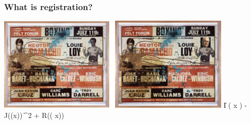 \begin{frame}
\frametitle{What is registration?}
\includegraphics[height=1.8in]{../Art/RegistrationBasquiatDeWarp.pdf}
\newline
\newline
\newline
\| I ( x ) - J(\phi(x)) \|^2  + R(\phi( x)) 
\newline
\end{frame}

